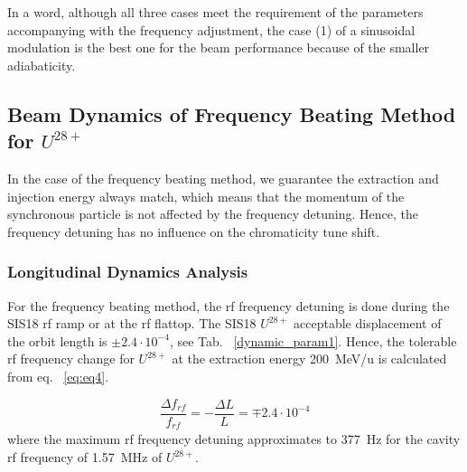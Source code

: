In a word, although all three cases meet the requirement of the parameters accompanying with the frequency adjustment, the case (1) of a sinusoidal modulation is the best one for the beam performance because of the smaller adiabaticity.  
\subsection{Beam Dynamics of Frequency Beating Method for $U^\mathit{28+}$} 
In the case of the frequency beating method, we guarantee the extraction and injection energy always match, which means that the momentum of the synchronous particle is not affected by the frequency detuning. Hence, the frequency detuning has no influence on the chromaticity tune shift.

\subsubsection{Longitudinal Dynamics Analysis}
 
For the frequency beating method, the rf frequency detuning is done during the SIS18 rf ramp or at the rf flattop. The SIS18 $U^\mathit{28+}$ acceptable displacement of the orbit length is $\pm2.4\cdot 10^{-4}$, see Tab. ~\ref{dynamic_param1}. Hence, the tolerable rf frequency change for $U^{28+}$ at the extraction energy \SI{200}{MeV/u} is calculated from eq. ~\ref{eq:eq4}.

\begin{equation}
\frac{\Delta{f}_\mathit{rf}}{f_\mathit{rf}} = -\frac{\Delta L}{L}= \mp 2.4 \cdot 10^{-4}
\end{equation}
where the maximum rf frequency detuning approximates to \SI{377}{Hz} for the cavity rf frequency of \SI{1.57}{MHz} of $U^{28+}$.

